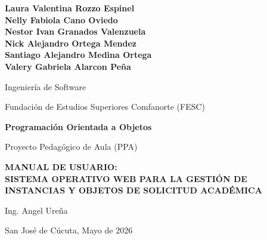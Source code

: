 \documentclass[12pt,letterpaper]{article}
\begin{document}
\begin{titlepage}
    \centering
    \vspace*{0.5in}

    {\normalsize\bfseries
    Laura Valentina Rozzo Espinel\\
    Nelly Fabiola Cano Oviedo\\
    Nestor Ivan Granados Valenzuela\\
    Nick Alejandro Ortega Mendez\\
    Santiago Alejandro Medina Ortega\\
    Valery Gabriela Alarcon Peña
    \par}
    \vspace{0.6in}

    {\normalsize Ingeniería de Software \par}
    \vspace{0.4in}

    {\normalsize Fundación de Estudios Superiores Comfanorte (FESC) \par}
    \vspace{0.6in}

    {\normalsize\bfseries Programación Orientada a Objetos \par}
    \vspace{0.4in}

    {\normalsize Proyecto Pedagógico de Aula (PPA) \par}
    \vspace{0.5in}

    {\normalsize\bfseries MANUAL DE USUARIO:\\ SISTEMA OPERATIVO WEB PARA LA GESTIÓN DE INSTANCIAS Y OBJETOS DE SOLICITUD ACADÉMICA\par}
    \vspace{0.6in}

    {\normalsize Ing. Angel Ureña \par}

    \vfill
    {\normalsize San José de Cúcuta, Mayo de 2026 \par}
\end{titlepage}

\newpage
\tableofcontents

\newpage
{}
\listoftables

\newpage
{}
\listoffigures
\end{document}
